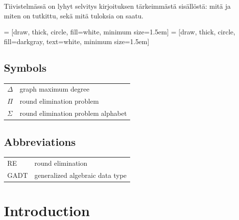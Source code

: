 \documentclass[english, 12pt, a4paper, sci, a-1b, online]{aaltothesis}
\date{2022}
\begin{document}
\makecoverpage{}

\makecopyrightpage{}

\begin{abstractpage}[english]
  \abstracttext{}
\end{abstractpage}

\newpage


\begin{abstractpage}[finnish]
  Tiivistelmässä on lyhyt selvitys
  kirjoituksen tärkeimmästä sisällöstä: mitä ja miten on tutkittu,
  sekä mitä tuloksia on saatu. 
\end{abstractpage}

\thesistableofcontents{}



\newtheorem{theorem}{Theorem}[section]
\newtheorem{lemma}{Lemma}[section]
\newtheorem{corollary}{Corollary}[theorem]

\newcommand{\reline}[1]{\textbf{#1}}

 = [draw, thick, circle, fill=white, minimum size=1.5em]
 = [draw, thick, circle, fill=darkgray, text=white, minimum size=1.5em]

\subsection*{Symbols}

\begin{tabular}{ll}
  $\Delta$ & graph maximum degree \\
  $\Pi$    & round elimination problem \\
  $\Sigma$ & round elimination problem alphabet
\end{tabular}

\subsection*{Abbreviations}

\begin{tabular}{ll}
  RE         & round elimination \\
  GADT       & generalized algebraic data type
\end{tabular}

\cleardoublepage{}
\section{Introduction}
\end{document}
